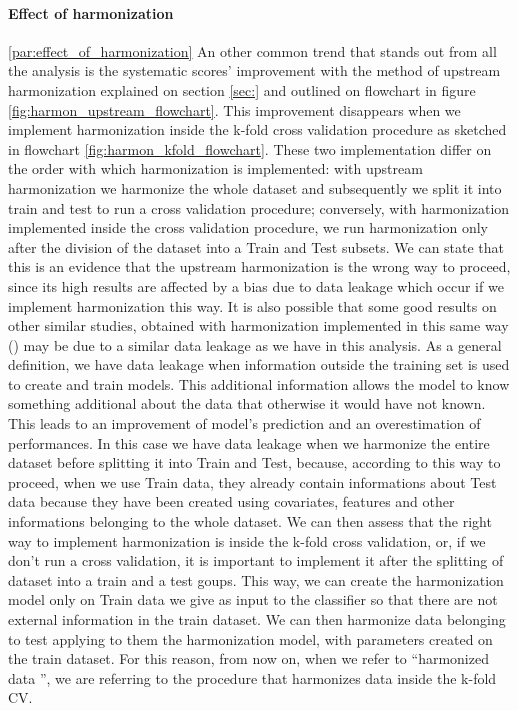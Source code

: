 \documentclass[10pt]{report}
\begin{document}
\paragraph{Effect of harmonization} \ref{par:effect_of_harmonization}
An other common trend that stands out from all the analysis is the systematic scores' improvement with the method of upstream harmonization explained on section \ref{sec:} and outlined on flowchart in figure \ref{fig:harmon_upstream_flowchart}.
This improvement disappears when we implement harmonization inside the k-fold cross validation procedure as sketched in flowchart \ref{fig:harmon_kfold_flowchart}.
These two implementation differ on the order with which harmonization is implemented: with upstream harmonization we harmonize the whole dataset and subsequently we split it into train and test to run a cross validation procedure; conversely, with harmonization implemented inside the cross validation procedure, we run harmonization only after the division of the dataset into a Train and Test subsets.
We can state that this is an evidence that the upstream harmonization is the wrong way to proceed, since its high results are affected by a bias due to data leakage which occur if we implement harmonization this way.
It is also possible that some good results on other similar studies, obtained with harmonization implemented in this same way (\cite{ingalhalikar-2021}) may be due to a similar data leakage as we have in this analysis.
As a general definition, we have data leakage when information outside the training set is used to create and train models. This additional information allows the model to know something additional about the data that otherwise it would have not known.
This leads to an improvement of model's prediction and an overestimation of performances.
In this case we have data leakage when we harmonize the entire dataset before splitting it into Train and Test, because, according to this way to proceed, when we use Train data, they already contain informations about Test data because they have been created using covariates, features and other informations belonging to the whole dataset.
We can then assess that the right way to implement harmonization is inside the k-fold cross validation, or, if we don't run a cross validation, it is important to implement it after the splitting of dataset into a train and a test goups. This way, we can create the harmonization model only on Train data we give as input to the classifier so that there are not external information in the train dataset.
We can then harmonize data belonging to test applying to them the harmonization model, with parameters created on the train dataset.
For this reason, from now on, when we refer to \textquotedblleft harmonized data \textquotedblright, we are referring to the procedure that harmonizes data inside the k-fold CV.
\end{document}
